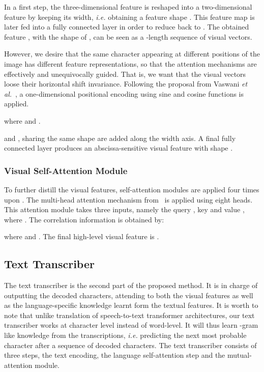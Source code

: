 \documentclass[10pt,twocolumn,letterpaper]{article}
\begin{document}
In a first step, the three-dimensional feature  is reshaped into a two-dimensional feature by keeping its width, \emph{i.e.} obtaining a feature shape . This feature map is later fed into a fully connected layer in order to reduce  back to . The obtained feature , with the shape of , can be seen as a -length sequence of visual vectors.

However, we desire that the same character appearing at different positions of the image has different feature representations, so that the attention mechanisms are effectively and unequivocally guided. That is, we want that the visual vectors  loose their horizontal shift invariance. Following the proposal from Vaswani \emph{et al.}~\cite{vaswani2017attention}, a one-dimensional positional encoding using sine and cosine functions is applied.


where  and .

 and , sharing the same shape are added along the width axis. A final fully connected layer produces an abscissa-sensitive visual feature  with shape .

\subsubsection{Visual Self-Attention Module}
\label{sec:sattn}
To further distill the visual features, self-attention modules are applied four times upon . The multi-head attention mechanism from~\cite{vaswani2017attention} is applied using eight heads. This attention module takes three inputs, namely the query , key  and value , where . The correlation information is obtained by:


where  and . The final high-level visual feature is .
\subsection{Text Transcriber}
The text transcriber is the second part of the proposed method. It is in charge of outputting the decoded characters, attending to both the visual features as well as the language-specific knowledge learnt form the textual features. It is worth to note that unlike translation of speech-to-text transformer architectures, our text transcriber works at character level instead of word-level. It will thus learn -gram like knowledge from the transcriptions, \emph{i.e.} predicting the next most probable character after a sequence of decoded characters. The text transcriber consists of three steps, the text encoding, the language self-attention step and the mutual-attention module. 
\end{document}
